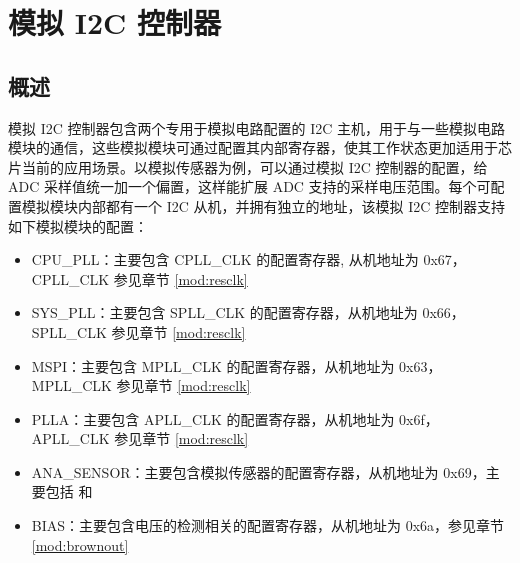\documentclass[main\_\_CN.tex]{subfiles}
\begin{document}

\ifglobal
\else
    {\let\clearpage\relax \listoftodos}
    {\let\clearpage\relax \listofdonetodos}
    \tableofcontents
\fi



\hypertarget{anai2c}{}
\chapter{模拟 I2C 控制器}
\label{mod:anai2c}




\section{概述}

模拟 I2C 控制器包含两个专用于模拟电路配置的 I2C 主机，用于与一些模拟电路模块的通信，这些模拟模块可通过配置其内部寄存器，使其工作状态更加适用于芯片当前的应用场景。以模拟传感器为例，可以通过模拟 I2C 控制器的配置，给 ADC 采样值统一加一个偏置，这样能扩展 ADC 支持的采样电压范围。每个可配置模拟模块内部都有一个 I2C 从机，并拥有独立的地址，该模拟 I2C 控制器支持如下模拟模块的配置：



\begin{itemize}
    \item CPU\_PLL：主要包含 CPLL\_CLK 的配置寄存器, 从机地址为 0x67， CPLL\_CLK 参见章节 \ref{mod:resclk} \textit{}
    \item SYS\_PLL：主要包含 SPLL\_CLK 的配置寄存器，从机地址为 0x66，SPLL\_CLK 参见章节 \ref{mod:resclk} \textit{}
    \item MSPI：主要包含 MPLL\_CLK 的配置寄存器，从机地址为 0x63，MPLL\_CLK 参见章节 \ref{mod:resclk} \textit{}
    \item PLLA：主要包含 APLL\_CLK 的配置寄存器，从机地址为 0x6f，APLL\_CLK 参见章节 \ref{mod:resclk} \textit{}
    \item ANA\_SENSOR：主要包含模拟传感器的配置寄存器，从机地址为 0x69，主要包括 \textit{} 和 \textit{}
    \item BIAS：主要包含电压的检测相关的配置寄存器，从机地址为 0x6a，参见章节 \ref{mod:brownout} \textit{}
\end{itemize}
\end{document}
